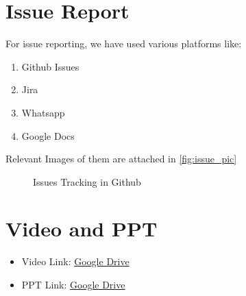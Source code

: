 \newpage
\section{Issue Report}
For issue reporting, we have used various platforms like:
\begin{enumerate}
    \tightlist
    \item Github Issues
    \item Jira
    \item Whatsapp
    \item Google Docs
\end{enumerate}

Relevant Images of them are attached in \autoref{fig:issue_pic}
\begin{figure}[H]
    \centering
    \caption{Issues Tracking in Github}
    \label{fig:issue_pic}
\end{figure}

\section{Video and PPT}
\begin{itemize}
    \item Video Link: \href{https://drive.google.com/file/d/1qBHOFE7LGVQW4yHuSdqfwHbBomY6MLy8/view?usp=drive_link}{Google Drive}
    \item PPT Link: \href{https://docs.google.com/presentation/d/1Vz_nPWuxCOxxy0lo2IrWU29k9SOpYvJk/edit?usp=drive_link&ouid=102662878024311248007&rtpof=true&sd=true}{Google Drive}
\end{itemize}